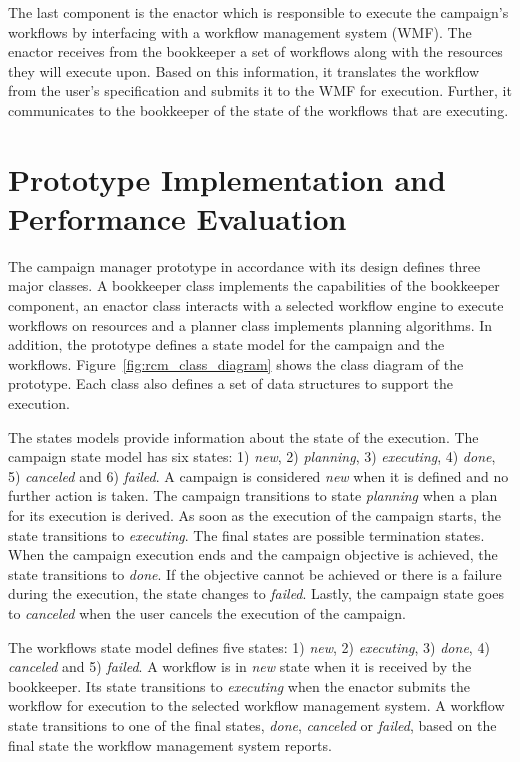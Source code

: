 The last component is the enactor which is responsible to execute the campaign's workflows by interfacing with a workflow management system (WMF).
The enactor receives from the bookkeeper a set of workflows along with the resources they will execute upon.
Based on this information, it translates the workflow from the user's specification and submits it to the WMF for execution.
Further, it communicates to the bookkeeper of the state of the workflows that are executing.

\section{Prototype Implementation and Performance Evaluation}
\label{sec:cm_impl}

The campaign manager prototype in accordance with its design defines three major classes.
A bookkeeper class implements the capabilities of the bookkeeper component, an enactor class interacts with a selected workflow engine to execute workflows on resources and a planner class implements planning algorithms.
In addition, the prototype defines a state model for the campaign and the workflows.
Figure~\ref{fig:rcm_class_diagram} shows the class diagram of the prototype.
Each class also defines a set of data structures to support the execution.

The states models provide information about the state of the execution.
The campaign state model has six states: 1) \textit{new}, 2) \textit{planning}, 3) \textit{executing}, 4) \textit{done}, 5) \textit{canceled} and 6) \textit{failed}.
A campaign is considered \textit{new} when it is defined and no further action is taken.
The campaign transitions to state \textit{planning} when a plan for its execution is derived.
As soon as the execution of the campaign starts, the state transitions to \textit{executing}.
The final states are possible termination states.
When the campaign execution ends and the campaign objective is achieved, the state transitions to \textit{done}.
If the objective cannot be achieved or there is a failure during the execution, the state changes to \textit{failed}.
Lastly, the campaign state goes to \textit{canceled} when the user cancels the execution of the campaign.

The workflows state model defines five states: 1) \textit{new}, 2) \textit{executing}, 3) \textit{done}, 4) \textit{canceled} and 5) \textit{failed}.
A workflow is in \textit{new} state when it is received by the bookkeeper.
Its state transitions to \textit{executing} when the enactor submits the workflow for execution to the selected workflow management system.
A workflow state transitions to one of the final states,  \textit{done}, \textit{canceled} or \textit{failed}, based on the final state the workflow management system reports.

